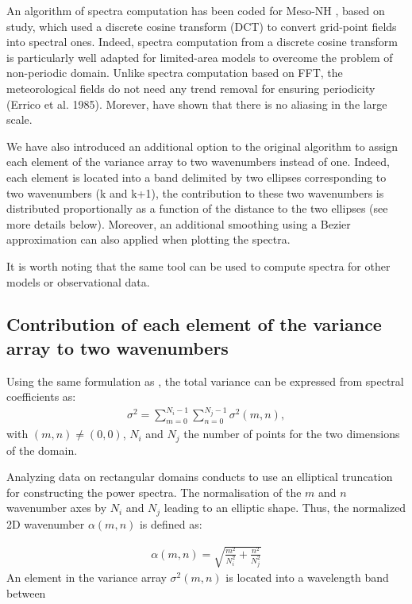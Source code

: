 An algorithm of spectra computation has been coded for Meso-NH \citep{Ricard2013}, based on \citet{Denis2002} study, which used a discrete cosine transform (DCT) 
\citep{Ahmed1974} to convert grid-point fields into spectral ones. 
Indeed, spectra computation from a discrete cosine transform is particularly well adapted for limited-area models
to overcome the problem of non-periodic domain. 
Unlike spectra computation based on FFT, the meteorological fields do not need any trend removal for ensuring periodicity (Errico et al. 1985). 
Morever, \citet{Denis2002} have shown that there is no aliasing in the large scale.  

We have also introduced an additional option to the original algorithm to assign each element of the variance array to two wavenumbers instead of one. 
Indeed, each element is located into a band delimited by two ellipses corresponding to two wavenumbers (k and k+1), 
the contribution to these two wavenumbers is distributed proportionally as a function of the distance to the two ellipses (see more details below). 
Moreover, an additional smoothing using a Bezier approximation can also applied when plotting the spectra. 

It is worth noting that the same tool can be used to compute spectra for other models or observational data. 


\subsection*{Contribution of each element of the variance array to two wavenumbers}

Using the same formulation as \citet{Denis2002}, the total variance can be expressed from spectral coefficients as: 
\begin{eqnarray*}
 \sigma^{2}=\sum_{m=0 }^{N_{i}-1}\sum_{n=0}^{N_{j}-1} \sigma^{2}(m,n), 
\end{eqnarray*}
with $(m,n)\neq(0,0)$, $N_{i}$ and $N_{j}$ the number of points for the two dimensions of the domain. 

Analyzing data on rectangular domains conducts to use an elliptical truncation for constructing the power spectra. The normalisation of the $m$ and $n$ wavenumber axes by $N_{i}$ and $N_{j}$ leading to an elliptic shape. Thus, the normalized 2D wavenumber $\alpha(m,n)$ is defined as:

\begin{eqnarray*}
\alpha(m,n) = \sqrt{\frac{m^2}{N_{i}^2}+ \frac{n^2}{N_{j}^2}}
\end{eqnarray*}
An element in the variance array $\sigma^2(m,n)$ is located into a wavelength band between

